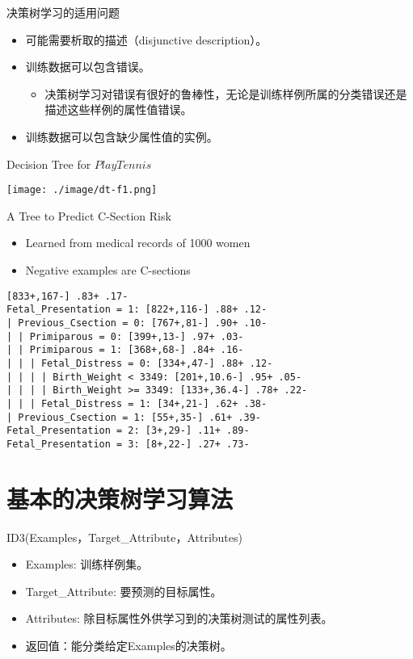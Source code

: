 \documentclass[presentation]{beamer}
\begin{document}
\begin{frame}[label={sec:org8117ce0}]{决策树学习的适用问题}
\begin{itemize}
\item 可能需要析取的描述（disjunctive description）。
\item 训练数据可以包含错误。
\begin{itemize}
\item 决策树学习对错误有很好的鲁棒性，无论是训练样例所属的分类错误还是描述这些样例的属性值错误。
\end{itemize}
\item 训练数据可以包含缺少属性值的实例。
\end{itemize}
\end{frame}

\begin{frame}[label={sec:orgb74536d}]{Decision Tree for \(PlayTennis\)}
\begin{center}
\texttt{[image: ./image/dt-f1.png]}
\end{center}
\end{frame}

\begin{frame}[label={sec:orgfd345aa},fragile]{A Tree to Predict C-Section Risk}
 \begin{itemize}
\item Learned from medical records of 1000 women
\item Negative examples are C-sections
\end{itemize}
\begin{verbatim}
[833+,167-] .83+ .17-
Fetal_Presentation = 1: [822+,116-] .88+ .12-
| Previous_Csection = 0: [767+,81-] .90+ .10-
| | Primiparous = 0: [399+,13-] .97+ .03-
| | Primiparous = 1: [368+,68-] .84+ .16-
| | | Fetal_Distress = 0: [334+,47-] .88+ .12-
| | | | Birth_Weight < 3349: [201+,10.6-] .95+ .05-
| | | | Birth_Weight >= 3349: [133+,36.4-] .78+ .22-
| | | Fetal_Distress = 1: [34+,21-] .62+ .38-
| Previous_Csection = 1: [55+,35-] .61+ .39-
Fetal_Presentation = 2: [3+,29-] .11+ .89-
Fetal_Presentation = 3: [8+,22-] .27+ .73-
\end{verbatim}
\end{frame}

\section{基本的决策树学习算法}
\label{sec:orgadfef82}
\begin{frame}[label={sec:org7561165}]{ID3(Examples，Target\_Attribute，Attributes)}
\begin{itemize}
\item Examples: 训练样例集。
\item Target\_Attribute: 要预测的目标属性。
\item Attributes: 除目标属性外供学习到的决策树测试的属性列表。
\item 返回值：能分类给定Examples的决策树。
\end{itemize}
\end{frame}
\end{document}
